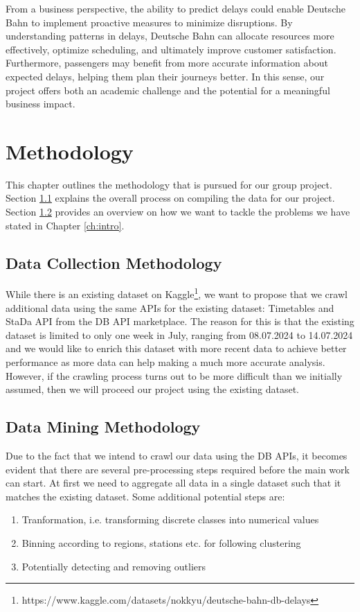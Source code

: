 \documentclass[a4paper,oneside,bibliography=totoc]{scrbook}
\begin{document}
From a business perspective, the ability to predict delays could enable Deutsche Bahn to implement proactive measures to minimize disruptions. By understanding patterns in delays, Deutsche Bahn can allocate resources more effectively, optimize scheduling, and ultimately improve customer satisfaction. Furthermore, passengers may benefit from more accurate information about expected delays, helping them plan their journeys better. In this sense, our project offers both an academic challenge and the potential for a meaningful business impact.

\chapter{Methodology}
\label{ch:methodology}
This chapter outlines the methodology that is pursued for our group project. Section \ref{sec:dataset} explains the overall process on compiling the data for our project. Section \ref{sec:data-mining-methodology} provides an overview on how we want to tackle the problems we have stated in Chapter \ref{ch:intro}.
\section{Data Collection Methodology}\label{sec:dataset}
While there is an existing dataset on Kaggle\footnote{https://www.kaggle.com/datasets/nokkyu/deutsche-bahn-db-delays}, we want to propose that we crawl additional data using the same APIs for the existing dataset: Timetables and StaDa API from the DB API marketplace.
The reason for this is that the existing dataset is limited to only one week in July, ranging from 08.07.2024 to 14.07.2024 and we would like to enrich this dataset with more recent data to achieve better performance as more data can help making a much more accurate analysis.
However, if the crawling process turns out to be more difficult than we initially assumed, then we will proceed our project using the existing dataset.

\section{Data Mining Methodology}\label{sec:data-mining-methodology}
Due to the fact that we intend to crawl our data using the DB APIs, it becomes evident that there are several pre-processing steps required before the main work can start. At first we need to aggregate all data in a single dataset such that it matches the existing dataset.
Some additional potential steps are:
\begin{enumerate}
  \item Tranformation, i.e. transforming discrete classes into numerical values
  \item Binning according to regions, stations etc. for following clustering
  \item Potentially detecting and removing outliers
\end{enumerate}
\end{document}
